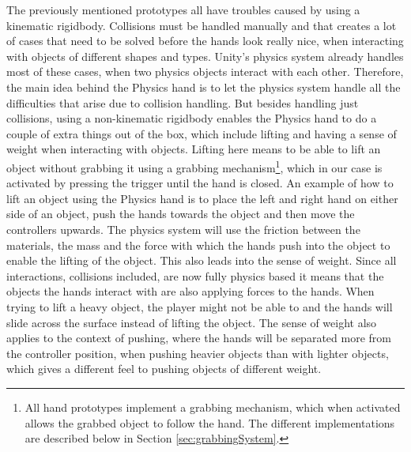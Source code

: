 The previously mentioned prototypes all have troubles caused by using a kinematic rigidbody. Collisions must be handled manually and that creates a lot of cases that need to be solved before the hands look really nice, when interacting with objects of different shapes and types. Unity's physics system already handles most of these cases, when two physics objects interact with each other. Therefore, the main idea behind the Physics hand is to let the physics system handle all the difficulties that arise due to collision handling. But besides handling just collisions, using a non-kinematic rigidbody enables the Physics hand to do a couple of extra things out of the box, which include lifting and having a sense of weight when interacting with objects. Lifting here means to be able to lift an object without grabbing it using a grabbing mechanism\footnote{All hand prototypes implement a grabbing mechanism, which when activated allows the grabbed object to follow the hand. The different implementations are described below in Section \ref{sec:grabbingSystem}.}, which in our case is activated by pressing the trigger until the hand is closed. An example of how to lift an object using the Physics hand is to place the left and right hand on either side of an object, push the hands towards the object and then move the controllers upwards. The physics system will use the friction between the materials, the mass and the force with which the hands push into the object to enable the lifting of the object. This also leads into the sense of weight. Since all interactions, collisions included, are now fully physics based it means that the objects the hands interact with are also applying forces to the hands. When trying to lift a heavy object, the player might not be able to and the hands will slide across the surface instead of lifting the object. The sense of weight also applies to the context of pushing, where the hands will be separated more from the controller position, when pushing heavier objects than with lighter objects, which gives a different feel to pushing objects of different weight.


